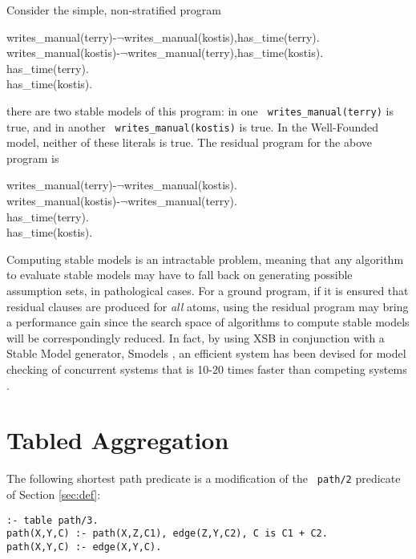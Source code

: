 \begin{example}
Consider the simple, non-stratified program
\begin{center}
\begin{Prog}
writes\_manual(terry)-$\neg$writes\_manual(kostis),has\_time(terry). \\
writes\_manual(kostis)-$\neg$writes\_manual(terry),has\_time(kostis). \\
has\_time(terry). \\
has\_time(kostis). \\
\end{Prog}
\end{center}
there are two stable models of this program: in one {\tt
writes\_manual(terry)} is true, and in another {\tt
writes\_manual(kostis)} is true.  In the Well-Founded model, neither
of these literals is true.  The residual program for the above program
is
\begin{center}
\begin{Prog}
writes\_manual(terry)-$\neg$writes\_manual(kostis). \\
writes\_manual(kostis)-$\neg$writes\_manual(terry). \\
has\_time(terry). \\
has\_time(kostis). \\
\end{Prog}
\end{center}
\end{example}

Computing stable models is an intractable problem, meaning that any
algorithm to evaluate stable models may have to fall back on
generating possible assumption sets, in pathological cases.  For a
ground program, if it is ensured that residual clauses are produced
for {\em all} atoms, using the residual program may bring a
performance gain since the search space of algorithms to compute
stable models will be correspondingly reduced.  In fact, by using XSB
in conjunction with a Stable Model generator, Smodels \cite{NiSi96},
an efficient system has been devised for model checking of concurrent
systems that is 10-20 times faster than competing systems
\cite{LiRS98}.  

\section{Tabled Aggregation} \label{sec:table-aggregation}

The following shortest path predicate is a modification of the {\tt
path/2} predicate of Section \ref{sec:def}:
\begin{center}
\begin{minipage}{3.8in}
\begin{verbatim}
:- table path/3.
path(X,Y,C) :- path(X,Z,C1), edge(Z,Y,C2), C is C1 + C2.
path(X,Y,C) :- edge(X,Y,C).
\end{verbatim}						       
\end{minipage}
\end{center}

